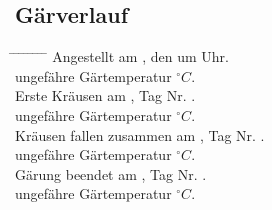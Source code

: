 \documentclass[12pt,oneside,a4paper]{scrartcl}
\begin{document}
{\subsection*{Gärverlauf}
	\begin{tabbing}
		\hspace{1cm} \= \hspace{1cm} \= \hspace{1cm} \= \hspace{1cm} \= \hspace{1cm} \= \hspace{1cm} \= \hspace{1cm} \= \hspace{1cm} \= \kill
		\> Angestellt am , den   um  Uhr.\\
		\> \> ungefähre Gärtemperatur  $^\circ C$.\\
		\> Erste Kräusen am \hspace{4cm}, Tag Nr.\hspace{2.5cm} .\\
		\> \> ungefähre Gärtemperatur \hspace{2.5cm}$^\circ C$.\\
		\> Kräusen fallen zusammen am \hspace{4cm}, Tag Nr. \hspace{2.5cm}.\\
		\> \> ungefähre Gärtemperatur \hspace{2.5cm}$^\circ C$.\\
		\> Gärung beendet am \hspace{4cm}, Tag Nr. \hspace{2.5cm}.\\
		\> \> ungefähre Gärtemperatur \hspace{2.5cm}$^\circ C$.
	\end{tabbing}
%
}
\end{document}
